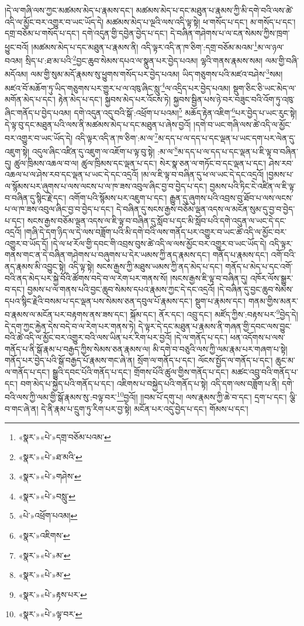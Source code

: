 །དེ་ལ་གཞི་ལས་ཀྱང་མཚམས་མེད་པ་རྣམས་དང་། མཚམས་མེད་པ་དང་མཐུན་པ་རྣམས་ཀྱི་མི་དགེ་བའི་ལས་ཚེ་འདི་ལ་མྱོང་བར་འགྱུར་བ་ཡང་ཡོད་དེ། མཚམས་མེད་པ་ལྔའི་ལས་འདི་ལྟ་སྟེ། ཕ་གསོད་པ་དང་། མ་གསོད་པ་དང་། དགྲ་བཅོམ་པ་གསོད་པ་དང་། དགེ་འདུན་གྱི་དབྱེན་བྱེད་པ་དང་། དེ་བཞིན་གཤེགས་པ་ལ་ངན་སེམས་ཀྱིས་ཁྲག་ཕྱུང་བའོ། །མཚམས་མེད་པ་དང་མཐུན་པ་རྣམས་ནི། འདི་ལྟར་འདི་ན་ཁ་ཅིག་:དགྲ་བཅོམ་མའམ་\footnote{«སྣར་»«པེ་»དགྲ་བཅོམ་པའམ་}མ་ལ་ཉལ་བའམ། སྲིད་པ་:ཐ་མ་པའི་\footnote{«སྣར་»«པེ་»ཐ་མའི་}བྱང་ཆུབ་སེམས་དཔའ་ལ་སྣུན་པར་བྱེད་པའམ། ལྷའི་གནས་རྣམས་སམ། ལམ་གྱི་བཞི་མདོའམ། ལམ་གྱི་སུམ་མདོ་རྣམས་སུ་ཕྱུགས་གསོད་པར་བྱེད་པའམ། ཡིད་གཅུགས་པའི་མཛའ་བཤེས་\footnote{«སྣར་»«པེ་»གཤེས་}སམ། མཛའ་བོ་མཆོག་ཏུ་ཡིད་གཅུགས་པར་གྱུར་པ་ལ་འཁུ་ཞིང་སླུ་\footnote{«སྣར་»«པེ་»བསླུ་}ལ་འདྲིད་པར་བྱེད་པའམ། སྡུག་ཅིང་ཅི་ཡང་མེད་ལ་མགོན་མེད་པ་དང་། རྟེན་མེད་པ་དང་། སྐྱབས་མེད་པར་འོངས་ཏེ། སྐྱབས་སྦྱིན་པས་ཉེ་བར་བཟུང་བའི་འོག་ཏུ་འཁུ་ཞིང་གནོད་པ་བྱེད་པའམ། དགེ་འདུན་འདུ་བའི་སྒོ་:འཕྲོག་པ་པའམ།\footnote{«པེ་»འཕྲོག་པའམ།} མཆོད་རྟེན་འཇིག་\footnote{«སྣར་»འཇིགས་}པར་བྱེད་པ་ཡང་རུང་སྟེ། དེ་ལྟ་བུ་དང་མཐུན་པའི་ལས་ནི་མཚམས་མེད་པ་དང་མཐུན་པ་ཞེས་བྱའོ། །དགེ་བ་ཡང་གཞི་ལས་ཚེ་འདི་ལ་མྱོང་བར་འགྱུར་བ་ཡང་ཡོད་དེ། འདི་ལྟར་འདི་ན་ཁ་ཅིག་:མ་ལ་\footnote{«སྣར་»«པེ་»མ་}མ་དད་པ་ལ་དད་པ་དང་ལྡན་པ་ཡང་དག་པར་ལེན་དུ་འཇུག་སྟེ། འདུལ་ཞིང་འཛིན་དུ་འཇུག་ལ་འཇོག་པ་ལྟ་བུ་སྟེ། :མ་ལ་\footnote{«སྣར་»«པེ་»མ་}མ་དད་པ་ལ་དད་པ་དང་ལྡན་པ་ཇི་ལྟ་བ་བཞིན་དུ། ཚུལ་ཁྲིམས་འཆལ་བ་ལ། ཚུལ་ཁྲིམས་དང་ལྡན་པ་དང་། སེར་སྣ་ཅན་ལ་གཏོང་བ་དང་ལྡན་པ་དང་། ཤེས་རབ་འཆལ་པ་ལ་ཤེས་རབ་དང་ལྡན་པ་ཡང་དེ་དང་འདྲའོ། །མ་ལ་ཇི་ལྟ་བ་བཞིན་དུ་ཕ་ལ་ཡང་དེ་དང་འདྲའོ། །བྱམས་པ་ལ་སྙོམས་པར་ཞུགས་པ་ལས་ལངས་པ་ལ་ཁ་ཟས་འབུལ་ཞིང་བྱ་བ་བྱེད་པ་དང་། བྱམས་པའི་ཏིང་ངེ་འཛིན་ལ་ཇི་ལྟ་བ་བཞིན་དུ་སྙིང་རྗེ་དང་། འགོག་པའི་སྙོམས་པར་འཇུག་པ་དང་། རྒྱུན་དུ་ཞུགས་པའི་འབྲས་བུ་ཐོབ་པ་ལས་ལངས་པ་ལ་ཁ་ཟས་འབུལ་ཞིང་བྱ་བ་བྱེད་པ་དང་། དེ་བཞིན་དུ་སངས་རྒྱས་བཅོམ་ལྡན་འདས་ལ་མངོན་སུམ་དུ་བྱ་བ་བྱེད་པ་དང་། སངས་རྒྱས་བཅོམ་ལྡན་འདས་ལ་ཇི་ལྟ་བ་བཞིན་དུ་སློབ་པ་དང་མི་སློབ་པའི་དགེ་འདུན་ལ་ཡང་དེ་དང་འདྲའོ། །གཞི་དེ་དག་ཉིད་ལ་དེ་ལས་བཟློག་པའི་མི་དགེ་བའི་ལས་གནོད་པར་འགྱུར་བ་ཡང་ཚེ་འདི་ལ་མྱོང་བར་འགྱུར་བ་ཡོད་དོ། །དེ་ལ་ཕ་རོལ་གྱི་དབང་གི་འབྲས་བུས་ཚེ་འདི་ལ་ལས་མྱོང་བར་འགྱུར་བ་ཡང་ཡོད་དེ། འདི་ལྟར་གནས་གང་ན་དེ་བཞིན་གཤེགས་པ་བཞུགས་པ་དེར་ཡམས་ཀྱི་ནད་རྣམས་དང་། གནོད་པ་རྣམས་དང་། འགོ་བའི་ནད་རྣམས་མི་འབྱུང་སྟེ། འདི་ལྟ་སྟེ། སངས་རྒྱས་ཀྱི་མཐུས་ཡམས་ཀྱི་ནད་མེད་པ་དང་། གནོད་པ་མེད་པ་དང་འགོ་བའི་ནད་མེད་པར་སྐྱེ་བོའི་ཚོགས་བདེ་བ་ལ་རེག་པར་གནས་སོ། །སངས་རྒྱས་ཇི་ལྟ་བ་བཞིན་དུ། འཁོར་ལོས་སྒྱུར་བ་དང་། བྱམས་པ་ལ་གནས་པའི་བྱང་ཆུབ་སེམས་དཔའ་རྣམས་ཀྱང་དེ་དང་འདྲའོ། །དེ་བཞིན་དུ་བྱང་ཆུབ་སེམས་དཔའ་སྙིང་རྗེའི་བསམ་པ་དང་ལྡན་པས་སེམས་ཅན་དབུལ་པོ་རྣམས་དང་། སྡུག་པ་རྣམས་དང་། གནམ་གྱིས་མནར་བ་རྣམས་ལ་མངོན་པར་བརྟགས་ནས་ཟས་དང་། སྐོམ་དང་། ནོར་དང་། འབྲུ་དང་། མཛོད་ཀྱིས་:བརྟས་པར་\footnote{«སྣར་»«པེ་»རྟས་པར་}བྱེད་དེ། དེ་དག་ཀྱང་རྐྱེན་དེས་བདེ་བ་ལ་རེག་པར་གནས་ཏེ། དེ་ལྟར་དེ་དང་མཐུན་པ་རྣམས་ནི་གཞན་གྱི་དབང་ལས་བྱུང་བའི་ཚེ་འདི་ལ་མྱོང་བར་འགྱུར་བའི་ལས་ཡིན་པར་རིག་པར་བྱའོ། །དེ་ལ་གནོད་པ་དང་། ཕན་འདོགས་པ་ལས་གནོད་པ་ནི་སྒོ་རྣམ་པ་བརྒྱད་ཀྱིས་སེམས་ཅན་རྣམས་ལ། མི་དགེ་བ་བཅུའི་ལས་ཀྱི་ལམ་རྣམ་པར་གཞག་པ་སྟེ། གནོད་པར་བྱེད་པའི་སྒོ་བརྒྱད་པོ་རྣམས་གང་ཞེ་ན། སྲོག་ལ་གནོད་པ་དང་། ལོངས་སྤྱོད་ལ་གནོད་པ་དང་། ཆུང་མ་ལ་གནོད་པ་དང་། སྒྱུའི་དབང་པོའི་གནོད་པ་དང་། གྲོགས་པོའི་ཚུལ་གྱིས་གནོད་པ་དང་། མཚང་འབྲུ་བའི་གནོད་པ་དང་། བག་མེད་པ་སྐྱེད་པའི་གནོད་པ་དང་། འཇིགས་པ་བསྐྱེད་པའི་གནོད་པ་སྟེ། འདི་དག་ལས་བཟློག་པ་ནི། དགེ་བའི་ལས་ཀྱི་ལམ་གྱི་སྒོ་རྣམས་སུ་:བལྟ་བར་\footnote{«སྣར་»«པེ་»ལྟ་བར་}བྱའོ།། །།བམ་པོ་དགུ་པ། ལས་རྣམས་ཀྱི་ཆེ་བ་དང་། དྲག་པ་དང་། ལྕི་བ་གང་ཞེ་ན། དེ་ནི་རྣམ་པ་དྲུག་ཏུ་རིག་པར་བྱ་སྟེ། མངོན་པར་འདུ་བྱེད་པ་དང་། གོམས་པ་དང་། 